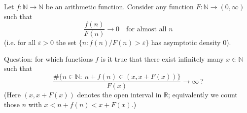 Let $f:\mathbb N\to\mathbb N$ be an arithmetic function.  Consider any function $F:\mathbb N\to(0,\infty)$ such that
\[
\frac{f(n)}{F(n)}\to 0\quad\text{for almost all }n
\]
(i.e. for all $\varepsilon>0$ the set $\{n: f(n)/F(n)>\varepsilon\}$ has asymptotic density $0$).

Question: for which functions $f$ is it true that there exist infinitely many $x\in\mathbb N$ such that
\[
\frac{\#\{n\in\mathbb N:\ n+f(n)\in (x,x+F(x))\}}{F(x)}\to\infty\ ?
\]
(Here $(x,x+F(x))$ denotes the open interval in $\mathbb R$; equivalently we count those $n$ with $x<n+f(n)<x+F(x)$.)
